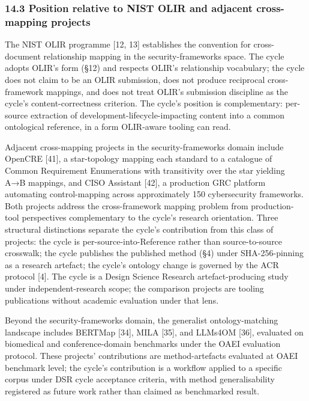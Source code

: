 \documentclass[
]{article}
\begin{document}
\subsubsection{14.3 Position relative to NIST OLIR and adjacent
cross-mapping
projects}\label{position-relative-to-nist-olir-and-adjacent-cross-mapping-projects}

The NIST OLIR programme {[}12, 13{]} establishes the convention for
cross-document relationship mapping in the security-frameworks space.
The cycle adopts OLIR's form (§12) and respects OLIR's relationship
vocabulary; the cycle does not claim to be an OLIR submission, does not
produce reciprocal cross-framework mappings, and does not treat OLIR's
submission discipline as the cycle's content-correctness criterion. The
cycle's position is complementary: per-source extraction of
development-lifecycle-impacting content into a common ontological
reference, in a form OLIR-aware tooling can read.

Adjacent cross-mapping projects in the security-frameworks domain
include OpenCRE {[}41{]}, a star-topology mapping each standard to a
catalogue of Common Requirement Enumerations with transitivity over the
star yielding A→B mappings, and CISO Assistant {[}42{]}, a production
GRC platform automating control-mapping across approximately 150
cybersecurity frameworks. Both projects address the cross-framework
mapping problem from production-tool perspectives complementary to the
cycle's research orientation. Three structural distinctions separate the
cycle's contribution from this class of projects: the cycle is
per-source-into-Reference rather than source-to-source crosswalk; the
cycle publishes the published method (§4) under SHA-256-pinning as a
research artefact; the cycle's ontology change is governed by the ACR
protocol {[}4{]}. The cycle is a Design Science Research
artefact-producing study under independent-research scope; the
comparison projects are tooling publications without academic evaluation
under that lens.

Beyond the security-frameworks domain, the generalist ontology-matching
landscape includes BERTMap {[}34{]}, MILA {[}35{]}, and LLMs4OM
{[}36{]}, evaluated on biomedical and conference-domain benchmarks under
the OAEI evaluation protocol. These projects' contributions are
method-artefacts evaluated at OAEI benchmark level; the cycle's
contribution is a workflow applied to a specific corpus under DSR cycle
acceptance criteria, with method generalisability registered as future
work rather than claimed as benchmarked result.
\end{document}
